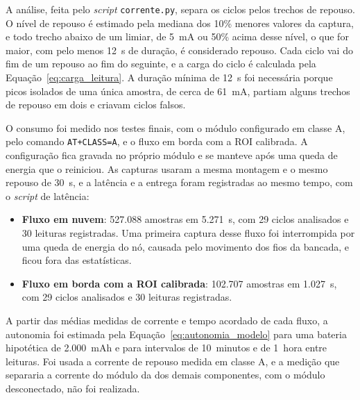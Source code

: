 A análise, feita pelo \textit{script} \texttt{corrente.py}, separa os ciclos pelos trechos
de repouso. O nível de repouso é estimado pela mediana dos 10\% menores valores da
captura, e todo trecho abaixo de um limiar, de 5~mA ou 50\% acima desse nível, o que for
maior, com pelo menos 12~s de duração, é considerado repouso. Cada ciclo vai do fim de um
repouso ao fim do seguinte, e a carga do ciclo é calculada pela
Equação~\eqref{eq:carga_leitura}. A duração mínima de 12~s foi necessária porque picos
isolados de uma única amostra, de cerca de 61~mA, partiam alguns trechos de repouso em
dois e criavam ciclos falsos.

O consumo foi medido nos testes finais, com o módulo configurado em classe A, pelo comando
\texttt{AT+CLASS=A}, e o fluxo em borda com a ROI calibrada. A configuração fica
gravada no próprio módulo e se manteve após uma queda de energia que o reiniciou. As
capturas usaram a mesma montagem e o mesmo repouso de 30~s, e a latência e a entrega foram
registradas ao mesmo tempo, com o \textit{script} de latência:

\begin{itemize}
    \item \textbf{Fluxo em nuvem}: 527.088 amostras em 5.271~s, com 29 ciclos analisados e
    30 leituras registradas. Uma primeira captura desse fluxo foi interrompida por uma queda
    de energia do nó, causada pelo movimento dos fios da bancada, e ficou fora das
    estatísticas.
    \item \textbf{Fluxo em borda com a ROI calibrada}: 102.707 amostras em 1.027~s, com 29
    ciclos analisados e 30 leituras registradas.
\end{itemize}

A partir das médias medidas de corrente e tempo acordado de cada fluxo, a autonomia foi
estimada pela Equação~\eqref{eq:autonomia_modelo} para uma bateria hipotética de
2.000~mAh e para intervalos de 10~minutos e de 1~hora entre leituras. Foi usada a corrente de repouso medida em classe A, e a
medição que separaria a corrente do módulo da dos demais componentes, com o
módulo desconectado, não foi realizada.
